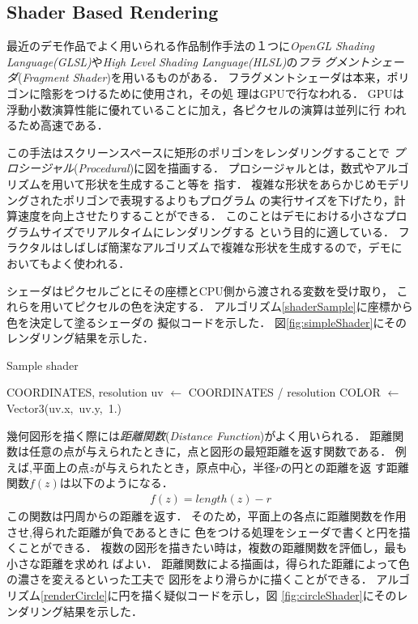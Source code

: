 \subsection{Shader Based Rendering}

最近のデモ作品でよく用いられる作品制作手法の１つに\textit{OpenGL Shading
Language(GLSL)}や\textit{High Level Shading Language(HLSL)}の\emph{フラ
グメントシェーダ}(\textit{Fragment Shader})を用いるものがある．
フラグメントシェーダは本来，ポリゴンに陰影をつけるために使用され，その処
理はGPUで行なわれる．
GPUは浮動小数演算性能に優れていることに加え，各ピクセルの演算は並列に行
われるため高速である．

この手法はスクリーンスペースに矩形のポリゴンをレンダリングすることで
\emph{プロシージャル}(\textit{Procedural})に図を描画する．
プロシージャルとは，数式やアルゴリズムを用いて形状を生成すること等を
指す．
複雑な形状をあらかじめモデリングされたポリゴンで表現するよりもプログラム
の実行サイズを下げたり，計算速度を向上させたりすることができる．
このことはデモにおける小さなプログラムサイズでリアルタイムにレンダリングする
という目的に適している．
フラクタルはしばしば簡潔なアルゴリズムで複雑な形状を生成するので，デモに
おいてもよく使われる．

シェーダはピクセルごとにその座標とCPU側から渡される変数を受け取り，
これらを用いてピクセルの色を決定する．
アルゴリズム\ref{shaderSample}に座標から色を決定して塗るシェーダの
擬似コードを示した．
図\ref{fig:simpleShader}にそのレンダリング結果を示した．
\begin{algorithm}
 \begin{algorithmic}
  \begin{minipage}{0.5\hsize}
   \caption{Sample shader}
   \label{shaderSample}
   \REQUIRE COORDINATES, resolution
   \STATE uv $\leftarrow$ COORDINATES / resolution
   \STATE COLOR $\leftarrow$ Vector3(uv.x,~uv.y,~1.)
  \end{minipage}
 \end{algorithmic}
\end{algorithm}

幾何図形を描く際には\emph{距離関数}(\textit{Distance Function})がよく用いられる．
距離関数は任意の点が与えられたときに，点と図形の最短距離を返す関数である．
例えば,平面上の点$z$が与えられたとき，原点中心，半径$r$の円との距離を返
す距離関数$f(z)$は以下のようになる．
\begin{align*}
 f(z) =  length(z) - r
\end{align*}
この関数は円周からの距離を返す．
そのため，平面上の各点に距離関数を作用させ,得られた距離が負であるときに
色をつける処理をシェーダで書くと円を描くことができる．
複数の図形を描きたい時は，複数の距離関数を評価し，最も小さな距離を求めれ
ばよい．
距離関数による描画は，得られた距離によって色の濃さを変えるといった工夫で
図形をより滑らかに描くことができる．
アルゴリズム\ref{renderCircle}に円を描く疑似コードを示し，図
\ref{fig:circleShader}にそのレンダリング結果を示した．

